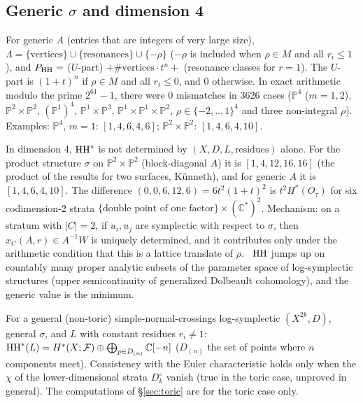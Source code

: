 \subsection{Generic $\sigma$ and dimension 4}
\begin{obs}[\tV]
For generic $A$ (entries that are integers of very large size), $\Lambda=\{\text{vertices}\}\cup\{\text{resonances}\}\cup\{-\rho\}$ ($-\rho$ is included when $\rho\in M$ and all $r_i\le1$), and $P_{\mathrm{HH}}=$ ($U$-part) $+\#\text{vertices}\cdot t^n+$ (resonance classes for $r=1$). The $U$-part is $(1+t)^n$ if $\rho\in M$ and all $r_i\le0$, and $0$ otherwise. In exact arithmetic modulo the prime $2^{61}-1$, there were 0 mismatches in 3626 cases ($\mathbb P^4$ ($m=1,2$), $\mathbb P^2\times\mathbb P^2$, $(\mathbb P^1)^4$, $\mathbb P^1\times\mathbb P^3$, $\mathbb P^1\times\mathbb P^1\times\mathbb P^2$, $\rho\in\{-2,..,1\}^4$ and three non-integral $\rho$). Examples: $\mathbb P^4$, $m=1$: $[1,4,6,4,6]$; $\mathbb P^2\times\mathbb P^2$: $[1,4,6,4,10]$.
\end{obs}
\begin{obs}\label{obs:arith}
In dimension 4, $\mathrm{HH}^*$ is not determined by $(X,D,L,\text{residues})$ alone. For the product structure $\sigma$ on $\mathbb P^2\times\mathbb P^2$ (block-diagonal $A$) it is $[1,4,12,16,16]$ (the product of the results for two surfaces, K\"unneth), and for generic $A$ it is $[1,4,6,4,10]$. The difference $(0,0,6,12,6)=6t^2(1+t)^2$ is $t^2H^*(O_\tau)$ for six codimension-2 strata $\{\text{double point of one factor}\}\times(\mathbb C^*)^2$. Mechanism: on a stratum with $|C|=2$, if $u_i,u_j$ are symplectic with respect to $\sigma$, then $x_C(A,r)\in A^{-1}W$ is uniquely determined, and it contributes only under the arithmetic condition that this is a lattice translate of $\rho$. \tK\ $\mathrm{HH}$ jumps up on countably many proper analytic subsets of the parameter space of log-symplectic structures (upper semicontinuity of generalized Dolbeault cohomology), and the generic value is the minimum.
\end{obs}
\begin{conj}\tK
For a general (non-toric) simple-normal-crossings log-symplectic $(X^{2k},D)$, general $\sigma$, and $L$ with constant residues $r_i\ne1$: $\mathrm{HH}^*(L)=H^*(X;\mathcal F)\oplus\bigoplus_{p\in D_{(n)}}\mathbb C[-n]$ ($D_{(n)}$ the set of points where $n$ components meet). Consistency with the Euler characteristic holds only when the $\chi$ of the lower-dimensional strata $D_k^\circ$ vanish (true in the toric case, unproved in general). The computations of \S\ref{sec:toric} are for the toric case only.
\end{conj}

